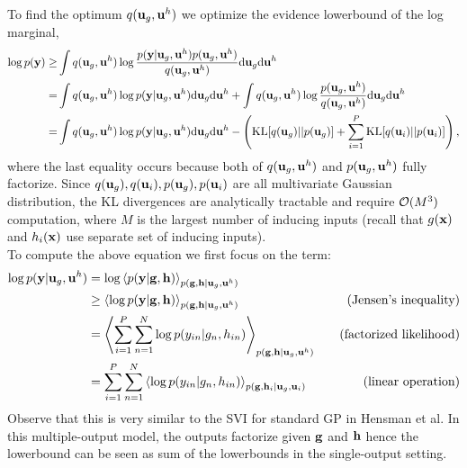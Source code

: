 \documentclass{article} %
\begin{document}
\noindent
To find the optimum $q(\mathbf{u}_g, \mathbf{u}^h)$ we optimize the evidence lowerbound of the log marginal,
\begin{align}
\nonumber
\log p(\mathbf{y}) \ge& \int q(\mathbf{u}_g, \mathbf{u}^h) \log \frac{p(\mathbf{y} | \mathbf{u}_g, \mathbf{u}^h) p(\mathbf{u}_g, \mathbf{u}^h)}{q(\mathbf{u}_g, \mathbf{u}^h)} \mathrm{d} \mathbf{u}_g \mathrm{d} \mathbf{u}^h \\
\nonumber
=& \int q(\mathbf{u}_g, \mathbf{u}^h) \log p(\mathbf{y} | \mathbf{u}_g, \mathbf{u}^h)  \mathrm{d} \mathbf{u}_g \mathrm{d} \mathbf{u}^h 
+ \int q(\mathbf{u}_g, \mathbf{u}^h) \log \frac{p(\mathbf{u}_g, \mathbf{u}^h)}{q(\mathbf{u}_g, \mathbf{u}^h)} \mathrm{d} \mathbf{u}_g \mathrm{d} \mathbf{u}^h \\
\label{eq:elbo}
=& \int q(\mathbf{u}_g, \mathbf{u}^h) \log p(\mathbf{y} | \mathbf{u}_g, \mathbf{u}^h)  \mathrm{d} \mathbf{u}_g \mathrm{d} \mathbf{u}^h 
- \left( \text{KL}[q(\mathbf{u}_g) || p(\mathbf{u}_g)] + \sum_{i=1}^P \text{KL}[q(\mathbf{u}_i) || p(\mathbf{u}_i)] \right),
\end{align}
where the last equality occurs because both of $q(\mathbf{u}_g, \mathbf{u}^h)$ and $p(\mathbf{u}_g, \mathbf{u}^h)$ fully factorize.
Since $q(\mathbf{u}_g), q(\mathbf{u}_i), p(\mathbf{u}_g), p(\mathbf{u}_i)$ are all multivariate Gaussian distribution, the KL divergences are analytically tractable and require $\mathcal{O}(M^3)$ computation, where $M$ is the largest number of inducing inputs (recall that $g(\mathbf{x})$ and $h_i(\mathbf{x})$ use separate set of inducing inputs). \\

\noindent To compute the above equation we first focus on the term:
\newcommand{\llangle}{\left\langle}
\newcommand{\rrangle}{\right\rangle}
\begin{align}
\nonumber
\log p(\mathbf{y} | \mathbf{u}_g, \mathbf{u}^h)
 &= \log \left\langle p(\mathbf{y} | \mathbf{g}, \mathbf{h}) \right\rangle_{p(\mathbf{g},\mathbf{h} | \mathbf{u}_g, \mathbf{u}^h)} \\
 \nonumber
&\ge \left\langle \log p(\mathbf{y} | \mathbf{g}, \mathbf{h}) \right\rangle_{p(\mathbf{g},\mathbf{h} | \mathbf{u}_g, \mathbf{u}^h)} \quad &\text{(Jensen's inequality)} \\
\nonumber
&=  \left\langle \sum_{i=1}^P \sum_{n=1}^N \log p(y_{in} | g_n, h_{in})  \right\rangle_{p(\mathbf{g},\mathbf{h} | \mathbf{u}_g, \mathbf{u}^h)}  \quad &\text{(factorized likelihood)} \\
&= \sum_{i=1}^P \sum_{n=1}^N \left\langle \log p(y_{in} | g_n, h_{in})  \right\rangle_{p(\mathbf{g},\mathbf{h}_i | \mathbf{u}_g, \mathbf{u}_i)} \quad &\text{(linear operation)}
\end{align}
Observe that this is very similar to the SVI for standard GP in Hensman et al. 
In this multiple-output model, the outputs factorize given $\mathbf{g}$ and $\mathbf{h}$ hence the lowerbound can be seen as sum of the lowerbounds in the single-output setting.
\end{document}
